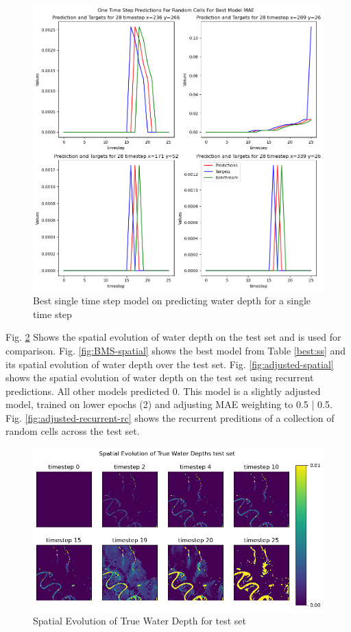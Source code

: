 \begin{figure}[tbph]
	\centering
	\includegraphics[width=0.8\linewidth, height=0.3\textheight]{Figures/Results/Final_Results/Best_Model_SS_SS_random_cell}
	\caption[Best single time step model on predicting water depth for a single time step]{Best single time step model on predicting water depth for a single time step}
	\label{fig:BSMS}
\end{figure}

Fig. \ref{fig:SpatialTrue} Shows the spatial evolution of water depth on the test set and is used for comparison. Fig. \ref{fig:BMS-spatial} shows the best model from Table \ref{best:ss} and its spatial evolution of water depth over the test set. Fig. \ref{fig:adjusted-spatial} shows the spatial evolution of water depth on the test set using recurrent predictions. All other models predicted 0. This model is a slightly adjusted model, trained on lower epochs (2) and adjusting MAE weighting to 0.5 | 0.5. Fig. \ref{fig:adjusted-recurrent-rc} shows the recurrent preditions of a collection of random cells across the test set.

\begin{figure}[tbph]
	\centering
	\includegraphics[width=0.8\linewidth, height=0.3\textheight]{Figures/Results/Final_Results/Best_Model_True_test_set}
	\caption[Spatial Evolution of True Water Depth for test set]{Spatial Evolution of True Water Depth for test set}
	\label{fig:SpatialTrue}
\end{figure}


